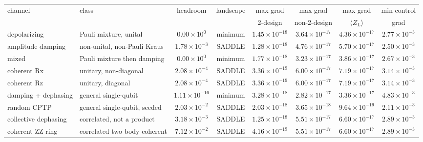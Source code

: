 \documentclass[10pt,a4paper]{article}
\begin{document}
\begin{longtable}{llcccccc}
\toprule channel & class & headroom & landscape & \multicolumn{1}{c}{max grad} & \multicolumn{1}{c}{max grad} & \multicolumn{1}{c}{max grad} & min control \\
 & & & & 2-design & non-2-design & $\langle Z_L\rangle$ & grad \\ \midrule
depolarizing & Pauli mixture, unital & $0.00\times 10^{0}$ & minimum & $1.45\times 10^{-18}$ & $3.64\times 10^{-17}$ & $4.36\times 10^{-17}$ & $2.77\times 10^{-3}$ \\
amplitude damping & non-unital, non-Pauli Kraus & $1.78\times 10^{-3}$ & SADDLE & $1.28\times 10^{-18}$ & $4.76\times 10^{-17}$ & $5.70\times 10^{-17}$ & $2.50\times 10^{-3}$ \\
mixed & Pauli mixture then damping & $0.00\times 10^{0}$ & minimum & $1.77\times 10^{-18}$ & $3.23\times 10^{-17}$ & $3.86\times 10^{-17}$ & $2.67\times 10^{-3}$ \\
coherent Rx & unitary, non-diagonal & $2.08\times 10^{-4}$ & SADDLE & $3.36\times 10^{-19}$ & $6.00\times 10^{-17}$ & $7.19\times 10^{-17}$ & $3.14\times 10^{-3}$ \\
coherent Rz & unitary, diagonal & $2.08\times 10^{-4}$ & SADDLE & $3.36\times 10^{-19}$ & $6.00\times 10^{-17}$ & $7.19\times 10^{-17}$ & $3.14\times 10^{-3}$ \\
damping + dephasing & general single-qubit & $1.11\times 10^{-16}$ & minimum & $3.28\times 10^{-18}$ & $2.82\times 10^{-17}$ & $3.36\times 10^{-17}$ & $4.83\times 10^{-3}$ \\
random CPTP & general single-qubit, seeded & $2.03\times 10^{-2}$ & SADDLE & $2.03\times 10^{-18}$ & $3.65\times 10^{-18}$ & $9.64\times 10^{-19}$ & $2.11\times 10^{-3}$ \\
collective dephasing & correlated, not a product & $3.18\times 10^{-3}$ & SADDLE & $1.25\times 10^{-18}$ & $5.51\times 10^{-17}$ & $6.60\times 10^{-17}$ & $2.89\times 10^{-3}$ \\
coherent ZZ ring & correlated two-body coherent & $7.12\times 10^{-2}$ & SADDLE & $4.16\times 10^{-19}$ & $5.51\times 10^{-17}$ & $6.60\times 10^{-17}$ & $2.89\times 10^{-3}$ \\
\bottomrule\end{longtable}
\end{document}

